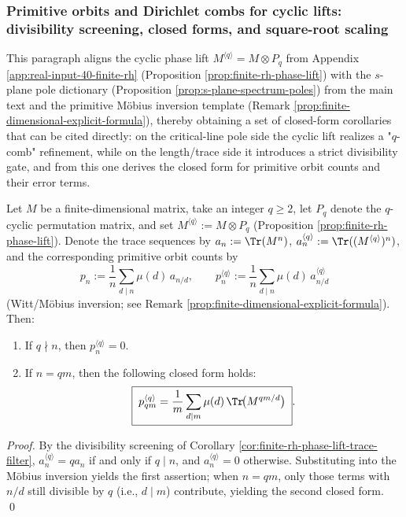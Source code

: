 \subsubsection{Primitive orbits and Dirichlet combs for cyclic lifts: divisibility screening, closed forms, and square-root scaling}\label{subsubsec:zeta-online-kernel-cyclic-lift-primitives}
This paragraph aligns the cyclic phase lift \(M^{\langle q\rangle}=M\otimes P_q\) from Appendix \ref{app:real-input-40-finite-rh} (Proposition \ref{prop:finite-rh-phase-lift}) with the
\(s\)-plane pole dictionary (Proposition \ref{prop:s-plane-spectrum-poles}) from the main text
and the primitive M\"obius inversion template (Remark \ref{prop:finite-dimensional-explicit-formula}),
thereby obtaining a set of closed-form corollaries that can be cited directly: on the critical-line pole side the cyclic lift realizes a "\(q\)-comb" refinement,
while on the length/trace side it introduces a strict divisibility gate, and from this one derives the closed form for primitive orbit counts and their error terms.

\begin{corollary}\label{cor:zeta-cyclic-lift-primitive-orbits}
Let \(M\) be a finite-dimensional matrix, take an integer \(q\ge 2\), let \(P_q\) denote the \(q\)-cyclic permutation matrix, and set \(M^{\langle q\rangle}:=M\otimes P_q\) (Proposition \ref{prop:finite-rh-phase-lift}).
Denote the trace sequences by \(a_n:=\Tr(M^n)\), \(a_n^{\langle q\rangle}:=\Tr((M^{\langle q\rangle})^n)\), and the corresponding primitive orbit counts by
\[
p_n:=\frac{1}{n}\sum_{d\mid n}\mu(d)\,a_{n/d},
\qquad
p_n^{\langle q\rangle}:=\frac{1}{n}\sum_{d\mid n}\mu(d)\,a^{\langle q\rangle}_{n/d}
\]
(Witt/M\"obius inversion; see Remark \ref{prop:finite-dimensional-explicit-formula}).
Then:
\begin{enumerate}
  \item If \(q\nmid n\), then \(p_n^{\langle q\rangle}=0\).
  \item If \(n=qm\), then the following closed form holds:
  \[
  \boxed{\;
  p_{qm}^{\langle q\rangle}
  =\frac{1}{m}\sum_{d\mid m}\mu(d)\,\Tr\!\bigl(M^{qm/d}\bigr)\; }.
  \]
\end{enumerate}
\end{corollary}
\begin{proof}
By the divisibility screening of Corollary \ref{cor:finite-rh-phase-lift-trace-filter},
\(
a_n^{\langle q\rangle}=q a_n
\)
if and only if \(q\mid n\), and \(a_n^{\langle q\rangle}=0\) otherwise.
Substituting into the M\"obius inversion yields the first assertion; when \(n=qm\), only those terms with \(n/d\) still divisible by \(q\) (i.e., \(d\mid m\)) contribute, yielding the second closed form. \qed
\end{proof}

